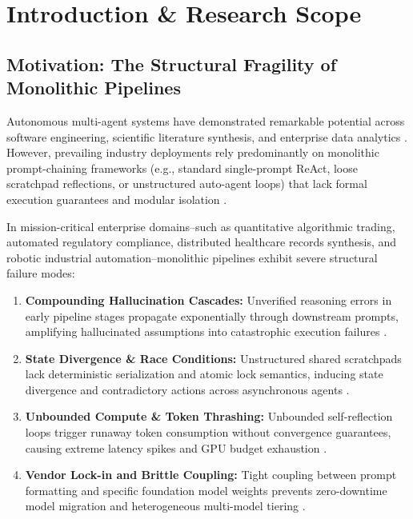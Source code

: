 \documentclass[10pt,twocolumn,letterpaper]{article}
\begin{document}
\section{Introduction \& Research Scope}



\subsection{Motivation: The Structural Fragility of Monolithic Pipelines}


Autonomous multi-agent systems have demonstrated remarkable potential across software engineering, scientific literature synthesis, and enterprise data analytics \cite{arxiv_2005_14165,arxiv_2203_02155}. However, prevailing industry deployments rely predominantly on monolithic prompt-chaining frameworks (e.g., standard single-prompt ReAct, loose scratchpad reflections, or unstructured auto-agent loops) that lack formal execution guarantees and modular isolation \cite{arxiv_2312_03893}.

In mission-critical enterprise domains--such as quantitative algorithmic trading, automated regulatory compliance, distributed healthcare records synthesis, and robotic industrial automation--monolithic pipelines exhibit severe structural failure modes:
\begin{enumerate}
  \item \textbf{Compounding Hallucination Cascades:} Unverified reasoning errors in early pipeline stages propagate exponentially through downstream prompts, amplifying hallucinated assumptions into catastrophic execution failures \cite{arxiv_2406_00584}.
  \item \textbf{State Divergence \& Race Conditions:} Unstructured shared scratchpads lack deterministic serialization and atomic lock semantics, inducing state divergence and contradictory actions across asynchronous agents \cite{arxiv_2501_02497}.
  \item \textbf{Unbounded Compute \& Token Thrashing:} Unbounded self-reflection loops trigger runaway token consumption without convergence guarantees, causing extreme latency spikes and GPU budget exhaustion \cite{arxiv_2405_01543,arxiv_2406_04028}.
  \item \textbf{Vendor Lock-in and Brittle Coupling:} Tight coupling between prompt formatting and specific foundation model weights prevents zero-downtime model migration and heterogeneous multi-model tiering \cite{arxiv_2305_18290,arxiv_2208_14227}.
\end{enumerate}
\end{document}
